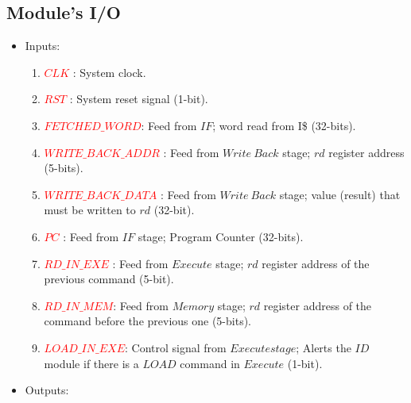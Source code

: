  	\subsection{Module's I/O}
 	\label{SubSec3.2.1:I/O}
 	{\small
 		\renewcommand{\labelenumii}{\Roman{enumii}}
 		\begin{itemize}
 			\item Inputs:
 			\begin{enumerate}
 				
 				\item \textcolor{red}{$CLK$} : System clock.
 				\item \textcolor{red}{$RST$} : System reset signal (1-bit). 
 				\item \textcolor{red}{$FETCHED\_WORD$}: Feed from $IF$; word read from I\$ (32-bits). 
 				\item \textcolor{red}{$WRITE\_BACK\_ADDR$}  : Feed from $Write\ Back$ stage; $rd$ register address (5-bits).
 				\item \textcolor{red}{$WRITE\_BACK\_DATA$}	: Feed from $Write\ Back$ stage; value (result) that must be written to $rd$ (32-bit).
 				\item \textcolor{red}{$PC$} : Feed from $IF$ stage; Program Counter (32-bits).
 				\item \textcolor{red}{$RD\_IN\_EXE$} : Feed from $Execute$ stage; $rd$ register address of the previous command (5-bit).
 				\item \textcolor{red}{$RD\_IN\_MEM$}: Feed from $Memory$ stage; $rd$ register address of the command before the previous one (5-bits).
 				\item \textcolor{red}{$LOAD\_IN\_EXE$}: Control signal from $Execute stage$; Alerts the $ID$ module if there is a $LOAD$ command in $Execute$ (1-bit).
 			\end{enumerate}
 			\item Outputs:
 			\begin{enumerate}
 				

\end{enumerate}
\end{itemize}}
